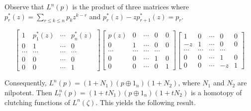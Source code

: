 Observe that $L^n(p)$ is the product of three matrices where $p_r^*(z) = \sum_{r \leq k \leq n} p_k z^{k-r}$ and $p_r^*(z) - zp_{r+1}^*(z) = p_r$.

$$\begin{bmatrix}
1 & p_1^*(z) & \cdots & p_n^*(z) \\
0 & 1 & \cdots & 0 \\
\cdots & \cdots & \cdots & \cdots \\
0 & 0 & \cdots & 0 \\
0 & 0 & \cdots & 1
\end{bmatrix} \begin{bmatrix}
p(z) & 0 & \cdots & 0 & 0 \\
0 & 1 & \cdots & 0 & 0 \\
\cdots & \cdots & \cdots & \cdots \\
0 & 0 & \cdots & 1 & 0 \\
0 & 0 & \cdots & 0 & 1
\end{bmatrix} \begin{bmatrix}
1 & 0 & \cdots & 0 & 0 \\
- z & 1 & \cdots & 0 & 0 \\
\cdots & \cdots & \cdots & \cdots \\
0 & 0 & \cdots & 1 & 0 \\
0 & 0 & \cdots & - z & 1
\end{bmatrix}$$

Consequently, $L^n(p) = (1 + N_1)(p \oplus 1_n)(1 + N_2)$, where $N_1$ and $N_2$ are nilpotent. Then $L_t^n(p) = (1 + tN_1)(p \oplus 1_n)(1 + tN_2)$ is a homotopy of clutching functions of $L^n(\zeta)$. This yields the following result.
